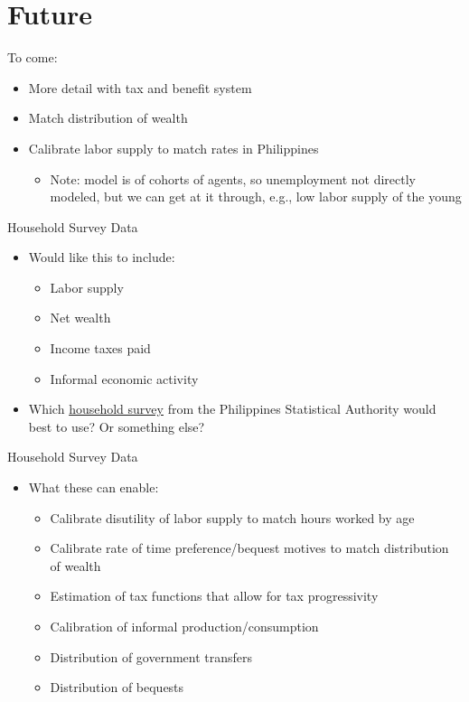 \documentclass{beamer}
\begin{document}
\section{Future}

\begin{frame}{To come:}
\begin{itemize}
  \item More detail with tax and benefit system
  \item Match distribution of wealth
  \item Calibrate labor supply to match rates in Philippines
    \begin{itemize}
      \item Note: model is of cohorts of agents, so unemployment not directly modeled, but we can get at it through, e.g., low labor supply of the young
    \end{itemize}
\end{itemize}
\end{frame}

\begin{frame}{Household Survey Data}
    \begin{itemize}
      \item Would like this to include:
        \begin{itemize}
          \item Labor supply
          \item Net wealth
          \item Income taxes paid
          \item Informal economic activity
        \end{itemize}
      \item Which \href{https://psada.psa.gov.ph/catalog/Household-based_Surveys/about}{household survey} from the Philippines Statistical Authority would best to use?  Or something else?
    \end{itemize}
  \end{frame}

    \begin{frame}{Household Survey Data}
    \begin{itemize}
      \item What these can enable:
        \begin{itemize}
          \item Calibrate disutility of labor supply to match hours worked by age
          \item Calibrate rate of time preference/bequest motives to match distribution of wealth
          \item Estimation of tax functions that allow for tax progressivity
          \item Calibration of informal production/consumption
          \item Distribution of government transfers
          \item Distribution of bequests
        \end{itemize}
    \end{itemize}
  \end{frame}
\end{document}
